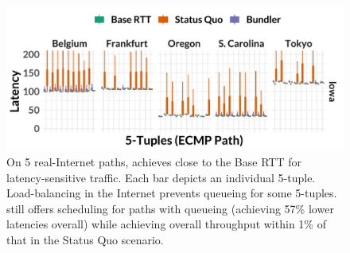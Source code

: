 \begin{figure}
    \centering
\begin{knitrout}
\color{fgcolor}
\includegraphics[width=\maxwidth]{figure/eval:realworld-1} 

\end{knitrout}
\newcommand{\realworldMedianLatencyImprovement}{57\%\xspace}
\newcommand{\realworldAvgBwRatio}{1\%\xspace}
\caption{On 5 real-Internet paths, \name achieves close to the Base RTT for latency-sensitive traffic. Each bar depicts an individual 5-tuple. Load-balancing in the Internet prevents queueing for some 5-tuples. \name still offers scheduling for paths with queueing (achieving \realworldMedianLatencyImprovement lower latencies overall) while achieving overall throughput within \realworldAvgBwRatio of that in the Status Quo scenario.}
    \label{fig:eval:realworld}
\end{figure}

\newcommand{\realworldMedianLatencyImprovement}{57\%\xspace}
\newcommand{\realworldAvgBwRatio}{1\%\xspace}

